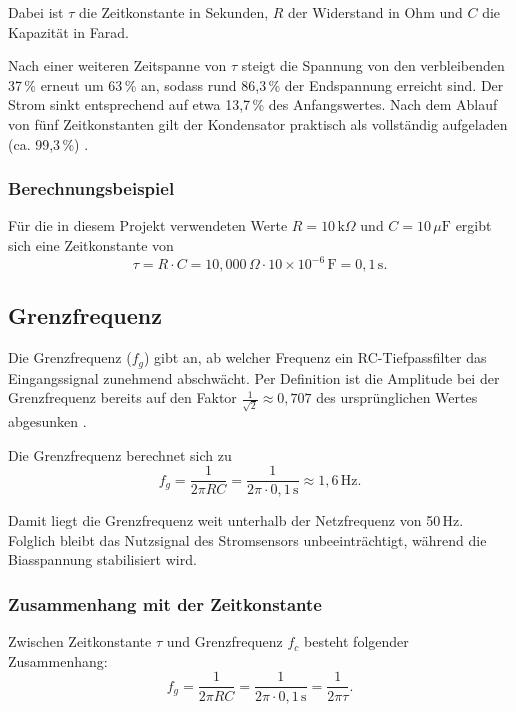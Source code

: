 	Dabei ist $\tau$ die Zeitkonstante in Sekunden, $R$ der Widerstand in Ohm und $C$ die Kapazität in Farad.
	
	Nach einer weiteren Zeitspanne von $\tau$ steigt die Spannung von den verbleibenden 37\,\% erneut um 63\,\% an, sodass rund 86,3\,\% der Endspannung erreicht sind. Der Strom sinkt entsprechend auf etwa 13,7\,\% des Anfangswertes. Nach dem Ablauf von fünf Zeitkonstanten gilt der Kondensator praktisch als vollständig aufgeladen (ca. 99,3\,\%) \cite[174--176]{Stiny:2024}.
	
\subsubsection*{Berechnungsbeispiel}
	Für die in diesem Projekt verwendeten Werte $R = 10\,\text{k}\Omega$ und $C = 10\,\mu\text{F}$ ergibt sich eine Zeitkonstante von
	\begin{equation}
		\tau = R \cdot C = 10{,}000 \,\Omega \cdot 10 \times 10^{-6}\,\text{F} = 0{,}1 \,\text{s}.
	\end{equation}

	
\subsection{Grenzfrequenz}
	Die Grenzfrequenz ($f_g$) gibt an, ab welcher Frequenz ein RC-Tiefpassfilter das Eingangssignal zunehmend abschwächt. Per Definition ist die Amplitude bei der Grenzfrequenz bereits auf den Faktor 
	\(\tfrac{1}{\sqrt{2}} \approx 0{,}707\) des ursprünglichen Wertes abgesunken \cite[340]{Stiny:2024}.
	
	Die Grenzfrequenz berechnet sich zu
	\begin{equation}
		f_g = \frac{1}{2 \pi R C} = \frac{1}{2 \pi \cdot 0{,}1\,\text{s}} \approx 1{,}6 \,\text{Hz}.
	\end{equation}
	
	Damit liegt die Grenzfrequenz weit unterhalb der Netzfrequenz von 50\,Hz. Folglich bleibt das Nutzsignal des Stromsensors unbeeinträchtigt, während die Biasspannung stabilisiert wird.
	
	\subsubsection*{Zusammenhang mit der Zeitkonstante}
	Zwischen Zeitkonstante \(\tau\) und Grenzfrequenz \(f_c\) besteht folgender Zusammenhang:
	\[
	f_g =  \frac{1}{2 \pi R C} = \frac{1}{2 \pi \cdot 0{,}1\,\text{s}} = \frac{1}{2 \pi \tau}.
	\]
	
